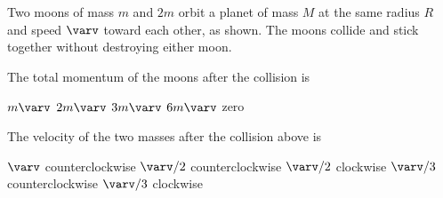 \documentclass{../../../oss-classkick-exam}
\begin{document}
\begin{multicols*}{2}
\begin{questions}
{      Two moons of mass $m$ and $2m$ orbit a planet of mass $M$ at the same
      radius $R$ and speed $\varv$ toward each other, as shown. The moons
      collide and stick together without destroying either moon.
      \begin{center}
      \end{center}
    }
    
    \question The total momentum of the moons after the collision is
    \label{moon1}
    \begin{choices}
      \choice $m\varv$
      \choice $2m\varv$
      \choice $3m\varv$
      \choice $6m\varv$
      \choice zero
    \end{choices}
    
    \question The velocity of the two masses after the collision above is
    \label{moon2}
    \begin{choices}
      \choice $\varv$ counterclockwise
      \choice $\varv/2$ counterclockwise
      \choice $\varv/2$ clockwise
      \choice $\varv/3$ counterclockwise
      \choice $\varv/3$ clockwise
    \end{choices}
    \vspace{.7in}
    
    

\end{questions}
\end{multicols*}
\end{document}
